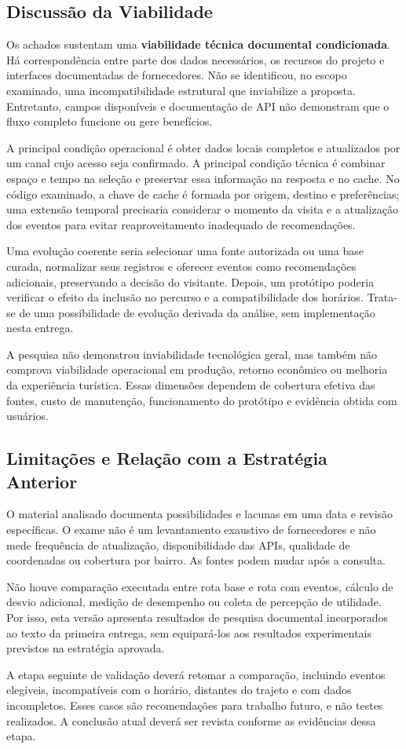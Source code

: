 \subsection{Discussão da Viabilidade}

Os achados sustentam uma \textbf{viabilidade técnica documental condicionada}. Há correspondência entre parte dos dados necessários, os recursos do projeto e interfaces documentadas de fornecedores. Não se identificou, no escopo examinado, uma incompatibilidade estrutural que inviabilize a proposta. Entretanto, campos disponíveis e documentação de API não demonstram que o fluxo completo funcione ou gere benefícios.

A principal condição operacional é obter dados locais completos e atualizados por um canal cujo acesso seja confirmado. A principal condição técnica é combinar espaço e tempo na seleção e preservar essa informação na resposta e no cache. No código examinado, a chave de cache é formada por origem, destino e preferências; uma extensão temporal precisaria considerar o momento da visita e a atualização dos eventos para evitar reaproveitamento inadequado de recomendações.

Uma evolução coerente seria selecionar uma fonte autorizada ou uma base curada, normalizar seus registros e oferecer eventos como recomendações adicionais, preservando a decisão do visitante. Depois, um protótipo poderia verificar o efeito da inclusão no percurso e a compatibilidade dos horários. Trata-se de uma possibilidade de evolução derivada da análise, sem implementação nesta entrega.

A pesquisa não demonstrou inviabilidade tecnológica geral, mas também não comprova viabilidade operacional em produção, retorno econômico ou melhoria da experiência turística. Essas dimensões dependem de cobertura efetiva das fontes, custo de manutenção, funcionamento do protótipo e evidência obtida com usuários.

\subsection{Limitações e Relação com a Estratégia Anterior}

O material analisado documenta possibilidades e lacunas em uma data e revisão específicas. O exame não é um levantamento exaustivo de fornecedores e não mede frequência de atualização, disponibilidade das APIs, qualidade de coordenadas ou cobertura por bairro. As fontes podem mudar após a consulta.

Não houve comparação executada entre rota base e rota com eventos, cálculo de desvio adicional, medição de desempenho ou coleta de percepção de utilidade. Por isso, esta versão apresenta resultados de pesquisa documental incorporados ao texto da primeira entrega, sem equipará-los aos resultados experimentais previstos na estratégia aprovada.

A etapa seguinte de validação deverá retomar a comparação, incluindo eventos elegíveis, incompatíveis com o horário, distantes do trajeto e com dados incompletos. Esses casos são recomendações para trabalho futuro, e não testes realizados. A conclusão atual deverá ser revista conforme as evidências dessa etapa.